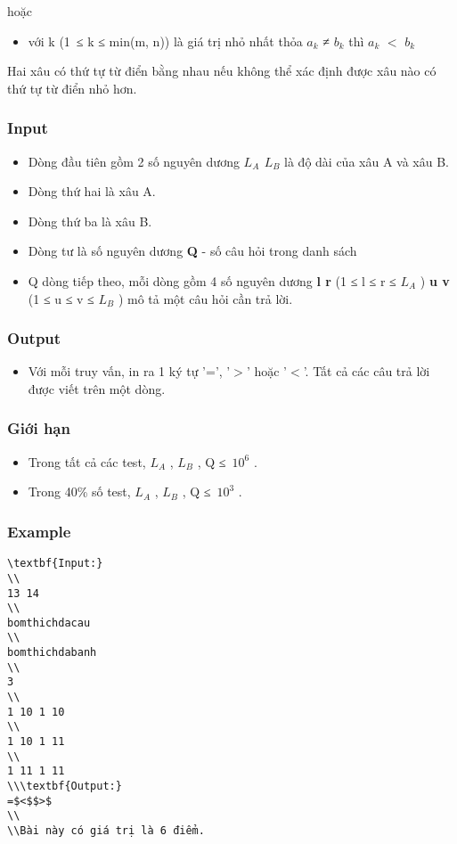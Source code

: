   hoặc  
\begin{itemize}
	\item     với k (1 ≤ k ≤ min(m, n)) là giá trị nhỏ nhất thỏa $a_{k}$    ≠ $b_{k}$    thì $a_{k}$    $<$ $b_{k}$
\end{itemize}

   Hai xâu có thứ tự từ điển bằng nhau nếu không thể xác định được xâu nào có thứ tự từ điển nhỏ hơn.  
\begin{itemize}
\end{itemize}

\subsubsection{   Input  }
\begin{itemize}
	\item     Dòng đầu tiên gồm 2 số nguyên dương    \textbf{     $L_{A}$     $L_{B}$}    là độ dài của xâu A và xâu B.   
	\item     Dòng thứ hai là xâu A.   
	\item     Dòng thứ ba là xâu B.   
	\item     Dòng tư là số nguyên dương    \textbf{     Q    }    - số câu hỏi trong danh sách   
	\item     Q dòng tiếp theo, mỗi dòng gồm 4 số nguyên dương    \textbf{     l r    }    (1 ≤ l ≤ r ≤ $L_{A}$    )    \textbf{     u v    }    (1 ≤ u ≤ v ≤ $L_{B}$    ) mô tả một câu hỏi cần trả lời.   
\end{itemize}

\subsubsection{   Output  }
\begin{itemize}
	\item     Với mỗi truy vấn, in ra 1 ký tự '=', '$>$' hoặc '$<$'. Tất cả các câu trả lời được viết trên một dòng.   
\end{itemize}

\subsubsection{   Giới hạn  }
\begin{itemize}
	\item     Trong tất cả các test, $L_{A}$    , $L_{B}$    , Q ≤ $10^{6}$    .   
	\item     Trong 40\% số test, $L_{A}$    , $L_{B}$    , Q ≤ $10^{3}$    .   
\end{itemize}

\subsubsection{   Example  }
\begin{verbatim}
\textbf{Input:}
\\
13 14
\\
bomthichdacau
\\
bomthichdabanh
\\
3
\\
1 10 1 10
\\
1 10 1 11
\\
1 11 1 11
\\\textbf{Output:}
=$<$$>$
\\
\\Bài này có giá trị là 6 điểm.\end{verbatim}
